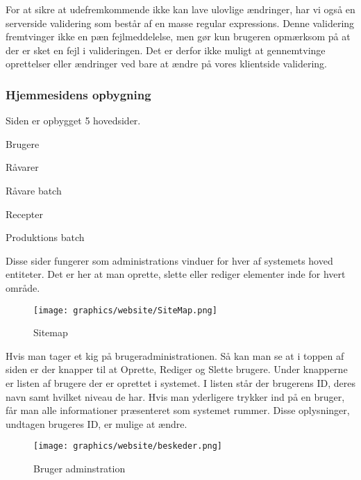 \documentclass[a4paper]{article}
\newenvironment{my_itemize}
{\begin{itemize}
  \setlength{\itemsep}{1pt}
  \setlength{\parskip}{0pt}
  \setlength{\parsep}{0pt}}
{\end{itemize}}
\newenvironment{changemargin}[2]{%
\begin{list}{}{%
\setlength{\topsep}{0pt}%
\setlength{\leftmargin}{#1}%
\setlength{\rightmargin}{#2}%
\setlength{\listparindent}{\parindent}%
\setlength{\itemindent}{\parindent}%
\setlength{\parsep}{\parskip}%
}%
\item[]}{\end{list}}
\begin{document}
For at sikre at udefremkommende ikke kan lave ulovlige ændringer, har vi også en serverside validering som består af en masse regular expressions. Denne validering fremtvinger ikke en pæn fejlmeddelelse, men gør kun brugeren opmærksom på at der er sket en fejl i valideringen. Det er derfor ikke muligt at gennemtvinge oprettelser eller ændringer ved bare at ændre på vores klientside validering. 


\subsubsection{Hjemmesidens opbygning} %

Siden er opbygget 5 hovedsider. 
\begin{my_itemize}
  \item Brugere
  \item Råvarer
  \item Råvare batch
  \item Recepter
  \item Produktions batch
\end{my_itemize}

Disse sider fungerer som administrations vinduer for hver af systemets hoved entiteter.  Det er her at man oprette, slette eller rediger elementer inde for hvert område. 

\begin{figure}[H]
\begin{changemargin}{-2cm}{-1cm}
  \centering
  \texttt{[image: graphics/website/SiteMap.png]}
  \caption{Sitemap}
\end{changemargin}
\end{figure}

Hvis man tager et kig på brugeradministrationen. Så kan man se at i toppen af siden er der knapper til at Oprette, Rediger og Slette brugere. Under knapperne er listen af brugere der er oprettet i systemet. I listen står der brugerens ID, deres navn samt hvilket niveau de har. Hvis man yderligere trykker ind på en bruger, får man alle informationer præsenteret som systemet rummer.  Disse oplysninger, undtagen brugeres ID, er mulige at ændre. 

\begin{figure}[H]
  \centering
  \texttt{[image: graphics/website/beskeder.png]}
  \caption{Bruger adminstration}
\end{figure}


\end{document}
